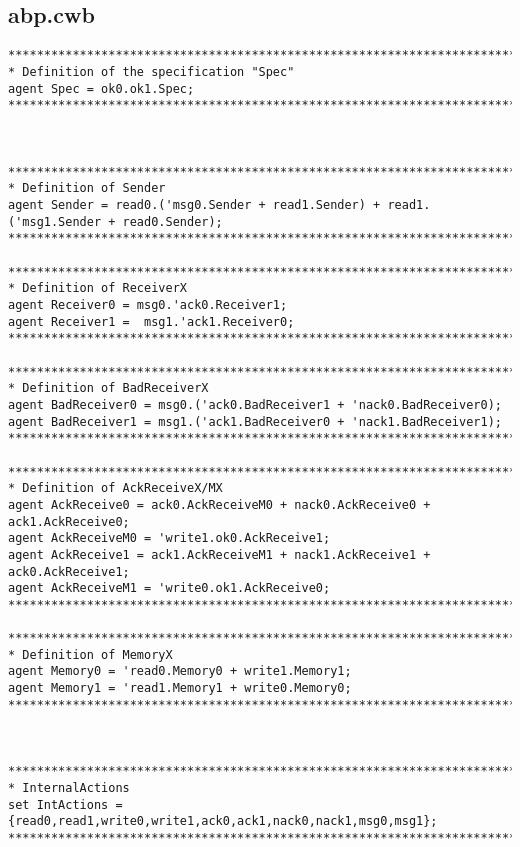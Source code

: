 \subsection{abp.cwb}\label{sec:cwb-definition}
\begin{lstlisting}[breaklines]
*******************************************************************************
* Definition of the specification "Spec"
agent Spec = ok0.ok1.Spec;
*******************************************************************************



*******************************************************************************
* Definition of Sender
agent Sender = read0.('msg0.Sender + read1.Sender) + read1.('msg1.Sender + read0.Sender);
*******************************************************************************

*******************************************************************************
* Definition of ReceiverX
agent Receiver0 = msg0.'ack0.Receiver1;
agent Receiver1 =  msg1.'ack1.Receiver0;
*******************************************************************************

*******************************************************************************
* Definition of BadReceiverX
agent BadReceiver0 = msg0.('ack0.BadReceiver1 + 'nack0.BadReceiver0);
agent BadReceiver1 = msg1.('ack1.BadReceiver0 + 'nack1.BadReceiver1);
*******************************************************************************

*******************************************************************************
* Definition of AckReceiveX/MX
agent AckReceive0 = ack0.AckReceiveM0 + nack0.AckReceive0 + ack1.AckReceive0;
agent AckReceiveM0 = 'write1.ok0.AckReceive1;
agent AckReceive1 = ack1.AckReceiveM1 + nack1.AckReceive1 + ack0.AckReceive1;
agent AckReceiveM1 = 'write0.ok1.AckReceive0;
*******************************************************************************

*******************************************************************************
* Definition of MemoryX
agent Memory0 = 'read0.Memory0 + write1.Memory1;
agent Memory1 = 'read1.Memory1 + write0.Memory0;
*******************************************************************************



*******************************************************************************
* InternalActions
set IntActions = {read0,read1,write0,write1,ack0,ack1,nack0,nack1,msg0,msg1};
*******************************************************************************




\end{lstlisting}
